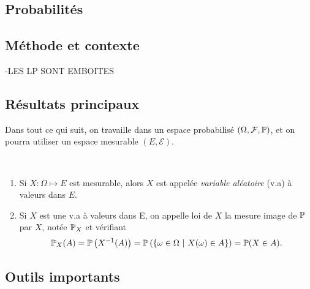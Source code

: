 \documentclass[11pt,a4paper]{article}
\begin{document}
\newpage
\begin{center}
\section*{Probabilités} 
\end{center}

%
%



\subsection*{Méthode et contexte}
-LES LP SONT EMBOITES 

\subsection*{Résultats principaux}
Dans tout ce qui suit, on travaille dans un espace probabilisé $(\Omega, \mathcal{F}, \P)$, et on pourra utiliser un espace mesurable $(E,\mathcal{E})$.

\begin{definstar} ~
\begin{enumerate}
\item Si $X: \Omega \mapsto E$ est mesurable, alors $X$ est appelée \textit{variable aléatoire} (v.a) à valeurs dans $E$.
\item Si $X$ est une v.a à valeurs dans E, on appelle loi de $X$ la mesure image de $\P$ par $X$, notée $\P_X$ et vérifiant \[\P_X(A) = \P\left(X^{-1}(A)\right)=\P\left(\left\{ \omega\in \Omega \setbar X(\omega)\in A \right\}\right) =\P(X\in A).\]
\end{enumerate}
\end{definstar}


\subsection*{Outils importants}



\end{document}
